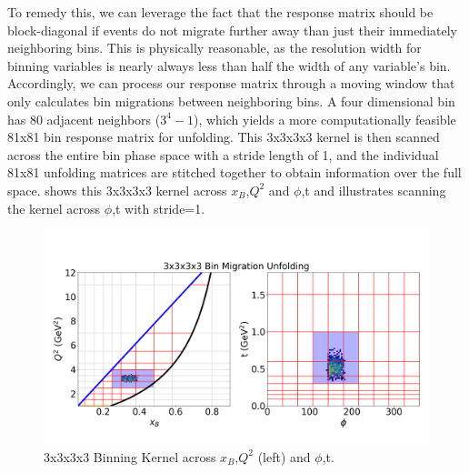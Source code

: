         
        
        

        To remedy this, we can leverage the fact that the response matrix should be block-diagonal if events do not migrate further away than just their immediately neighboring bins. This is physically reasonable, as the resolution width for binning variables is nearly always less than half the width of any variable's bin. Accordingly, we can process our response matrix through a moving window that only calculates bin migrations between neighboring bins. A four dimensional bin has 80 adjacent neighbors ($3^4-1$), which yields a more computationally feasible 81x81 bin response matrix for unfolding. This 3x3x3x3 kernel is then scanned across the entire bin phase space with a stride length of 1, and the individual 81x81 unfolding matrices are stitched together to obtain information over the full space.  shows this 3x3x3x3 kernel across $x_B$,$Q^2$ and $\phi$,t and  illustrates scanning the kernel across $\phi$,t with stride=1.

        \begin{figure}[H]
            \centering
            \includegraphics[trim={0 0 0 0},clip,width=.8\textwidth]{Chapters/Ch5-Further/0_IBU/pics/kerneling/bin_migration_1_1_1_1.png}
            \caption[3x3x3x3 Binning Kernel]{3x3x3x3 Binning Kernel across  $x_B$,$Q^2$ (left) and $\phi$,t. }
            \label{fig:ibu_window_1}
        \end{figure}
        
